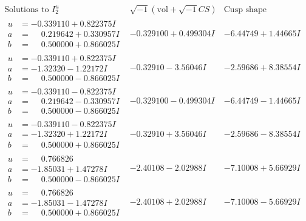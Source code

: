 \documentclass[1p]{elsarticle_modified}
\theoremstyle{definition}
\newcommand{\I}{\sqrt{-1}}
\begin{document}
$$\begin{array}{c|c|c}  
\text{Solutions to }I^u_{2}& \I (\text{vol} + \sqrt{-1}CS) & \text{Cusp shape}\\
 \hline 
\begin{aligned}
u &= -0.339110 + 0.822375 I \\
a &= \phantom{-}0.219642 + 0.330957 I \\
b &= \phantom{-}0.500000 + 0.866025 I\end{aligned}
 & -0.329100 + 0.499304 I & -6.44749 + 1.44665 I \\ \hline\begin{aligned}
u &= -0.339110 + 0.822375 I \\
a &= -1.32320 - 1.22172 I \\
b &= \phantom{-}0.500000 - 0.866025 I\end{aligned}
 & -0.32910 - 3.56046 I & -2.59686 + 8.38554 I \\ \hline\begin{aligned}
u &= -0.339110 - 0.822375 I \\
a &= \phantom{-}0.219642 - 0.330957 I \\
b &= \phantom{-}0.500000 - 0.866025 I\end{aligned}
 & -0.329100 - 0.499304 I & -6.44749 - 1.44665 I \\ \hline\begin{aligned}
u &= -0.339110 - 0.822375 I \\
a &= -1.32320 + 1.22172 I \\
b &= \phantom{-}0.500000 + 0.866025 I\end{aligned}
 & -0.32910 + 3.56046 I & -2.59686 - 8.38554 I \\ \hline\begin{aligned}
u &= \phantom{-}0.766826\phantom{ +0.000000I} \\
a &= -1.85031 + 1.47278 I \\
b &= \phantom{-}0.500000 - 0.866025 I\end{aligned}
 & -2.40108 - 2.02988 I & -7.10008 + 5.66929 I \\ \hline\begin{aligned}
u &= \phantom{-}0.766826\phantom{ +0.000000I} \\
a &= -1.85031 - 1.47278 I \\
b &= \phantom{-}0.500000 + 0.866025 I\end{aligned}
 & -2.40108 + 2.02988 I & -7.10008 - 5.66929 I \\ \hline\begin{aligned}

\end{aligned}
\end{array}$$
\end{document}
